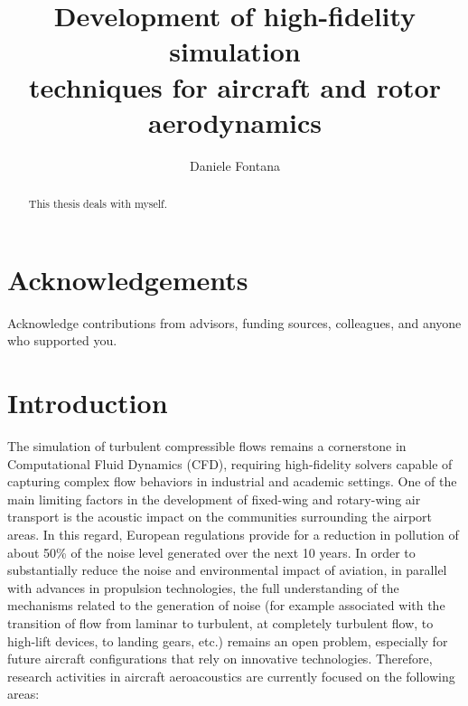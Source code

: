 \documentclass[a5paper]{sapthesis}
\title{Development of high-fidelity simulation  \\
	   techniques for aircraft and rotor aerodynamics}
\author{Daniele Fontana}
\begin{document}
	
	\maketitle
	\dedication{Dedicated to\\ Ilaria}
	
	\begin{abstract}
		This thesis deals with myself.
	\end{abstract}
	
	\chapter*{Acknowledgements}
	Acknowledge contributions from advisors, funding sources, colleagues, and anyone who supported you.	
	
	\tableofcontents

	\listoffigures
	\listoftables
	\cleardoublepage
	
	\chapter{Introduction}
	\label{chap:intro}
	
	The simulation of turbulent compressible flows remains a cornerstone in Computational Fluid Dynamics (CFD), requiring high-fidelity solvers capable of capturing complex flow behaviors in industrial and academic settings. One of the main limiting factors in the development of fixed-wing and rotary-wing air transport is the acoustic impact on the communities surrounding the airport areas. In this regard, European regulations provide for a reduction in pollution of about 50\% of the noise level generated over the next 10 years. In order to substantially reduce the noise and environmental impact of aviation, in parallel with advances in propulsion technologies, the full understanding of the mechanisms related to the generation of noise (for example associated with the transition of flow from laminar to turbulent, at completely turbulent flow, to high-lift devices, to landing gears, etc.) remains an open problem, especially for future aircraft configurations that rely on innovative technologies. Therefore, research activities in aircraft aeroacoustics are currently focused on the following areas:
	
\end{document}
